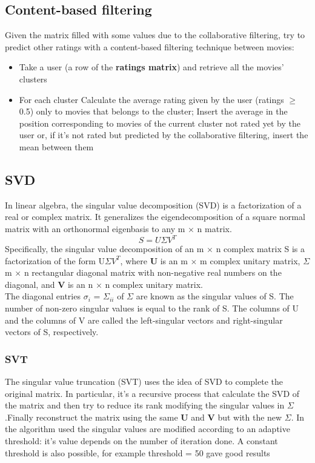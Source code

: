 \documentclass{article}
\begin{document}
\subsection{Content-based filtering}
Given the matrix filled with some values due to the collaborative filtering, try to predict other ratings with a content-based filtering technique between movies:
\begin{itemize}
    \item Take a user (a row of the \textbf{ratings matrix}) and retrieve all the movies' clusters
    \item For each cluster
    \subitem Calculate the average rating given by the user (ratings $\ge$ 0.5) only to movies that belongs to the cluster;
    \subitem Insert the average in the position corresponding to movies of the current cluster not rated yet by the user or, if it's not rated but predicted by the collaborative filtering, insert the mean between them
\end{itemize}


\subsection{SVD}
In linear algebra, the singular value decomposition (SVD) is a factorization of a real or complex matrix. It generalizes the eigendecomposition of a square normal matrix with an orthonormal eigenbasis to any m × n matrix.
\begin{equation}
      S = U\Sigma V^T
\end{equation}
Specifically, the singular value decomposition of an m $\times$ n complex matrix S is a factorization of the form U$\Sigma V^T$, where \textbf{U} is an m $\times$ m complex unitary matrix, \textbf{$\Sigma$} m $\times$ n rectangular diagonal matrix with non-negative real numbers on the diagonal, and \textbf{V} is an n $\times$ n complex unitary matrix.\\
The diagonal entries $\sigma _{i}$ = $\Sigma _{ii}$ of $\Sigma$ are known as the singular values of S. The number of non-zero singular values is equal to the rank of S. The columns of U and the columns of V are called the left-singular vectors and right-singular vectors of S, respectively.\\

\subsubsection{SVT}
The singular value truncation (SVT) uses the idea of SVD to complete the original matrix. In particular, it's a recursive process that calculate the SVD of the matrix and then try to reduce its rank modifying the singular values in $\Sigma$.Finally reconstruct the matrix using the same \textbf{U} and \textbf{V} but with the new $\Sigma$. In the algorithm used the singular values are modified according to an adaptive threshold: it's value depends on the number of iteration done. A constant threshold is also possible, for example threshold = 50 gave good results\newline
\end{document}
